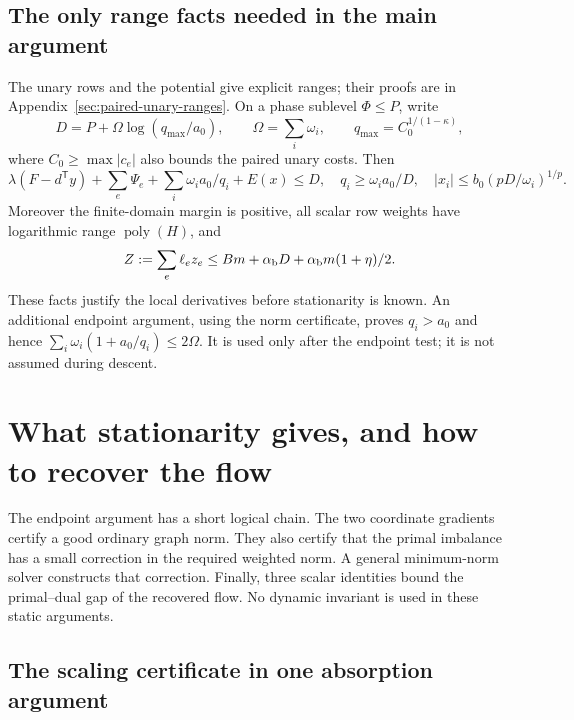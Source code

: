 \documentclass[11pt]{article}
\theoremstyle{definition}\newtheorem{definition}[theorem]{Definition}
\theoremstyle{remark}\newtheorem{remark}[theorem]{Remark}
\newcommand{\poly}{\operatorname{poly}}
\begin{document}
\subsection{The only range facts needed in the main argument}

The unary rows and the potential give explicit ranges; their proofs are
in Appendix~\ref{sec:paired-unary-ranges}. On a phase sublevel
$\Phi\le P$, write
\[
 D=P+\Omega\log(q_{\max}/a_0),\qquad
 \Omega=\sum_i\omega_i,\qquad q_{\max}=C_0^{1/(1-\kappa)},
\]
where $C_0\ge\max|c_e|$ also bounds the paired unary costs.
Then
\begin{equation}\label{eq:range-summary}
 \lambda(F-d^{\mathsf T}y)+\sum_e\Psi_e+
 \sum_i\omega_i a_0/q_i+E(x)\le D,
 \quad q_i\ge\omega_i a_0/D,
 \quad |x_i|\le b_0(pD/\omega_i)^{1/p}.
\end{equation}
Moreover the finite-domain margin is positive, all scalar row weights
have logarithmic range $\poly(H)$, and
\begin{equation}\label{eq:Z-summary}
 Z:=\sum_e\ell_ez_e\le Bm+\alpha_{\rm b}D+
                         \alpha_{\rm b}m(1+\eta)/2.
\end{equation}
These facts justify the local derivatives before stationarity is known.
An additional endpoint argument, using the norm certificate, proves
$q_i>a_0$ and hence $\sum_i\omega_i(1+a_0/q_i)\le2\Omega$.
It is used only after the endpoint test; it is not assumed during descent.


\section{What stationarity gives, and how to recover the flow}
\label{sec:recovery-endpoint}

The endpoint argument has a short logical chain. The two coordinate
gradients certify a good ordinary graph norm. They also certify that the
primal imbalance has a small correction in the required weighted norm.
A general minimum-norm solver constructs that correction. Finally, three
scalar identities bound the primal--dual gap of the recovered flow.
No dynamic invariant is used in these static arguments.

\subsection{The scaling certificate in one absorption argument}
\end{document}
